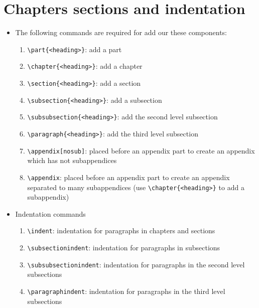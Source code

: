 \section{Chapters sections and indentation}

\begin{itemize}
	\item The following commands are required for add our these components:
	\begin{enumerate}[1)]
		\item	\verb|\part{<heading>}|: add a part
		\item	\verb|\chapter{<heading>}|: add a chapter
		\item	\verb|\section{<heading>}|: add a section
		\item	\verb|\subsection{<heading>}|: add a subsection
		\item	\verb|\subsubsection{<heading>}|: add the second level subsection
		\item	\verb|\paragraph{<heading>}|: add the third level subsection
		\item	\verb|\appendix[nosub]|: placed before an appendix part to create an appendix which has not subappendices 
		\item	\verb|\appendix|: placed before an appendix part to create an appendix separated to many subappendices (use \verb|\chapter{<heading>}| to add a subappendix)
	\end{enumerate}
	\item Indentation commands
	\begin{enumerate}[1)]
		\item \verb|\indent|: indentation for paragraphs in chapters and sections
		\item \verb|\subsectionindent|: indentation for paragraphs in subsections
		\item \verb|\subsubsectionindent|: indentation for paragraphs in the second level subsections
		\item \verb|\paragraphindent|: indentation for paragraphs in the third level subsections
	\end{enumerate}
\end{itemize}
